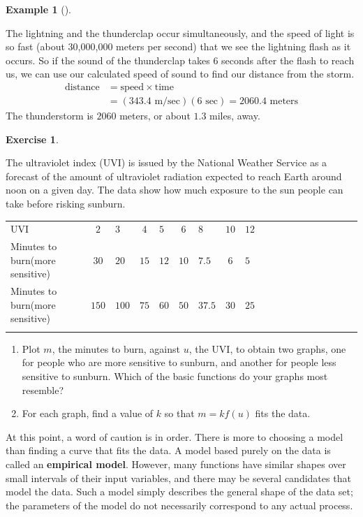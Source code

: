 \documentclass[10pt,]{book}
\newcommand{\terminology}[1]{\textbf{#1}}
\theoremstyle{plain}
\theoremstyle{definition}
\newtheorem{exercise}[theorem]{Exercise}
\theoremstyle{definition}
\newtheorem{example}[theorem]{Example}
\numberwithin{equation}{section}
\newcommand{\hrulethin}  {\noalign{\hrule height 0.04em}}
\newcommand{\hrulethick} {\noalign{\hrule height 0.11em}}
\newcommand{\amp}{ & }
\begin{document}
\begin{example}[]
\begin{enumerate}[label=*\alph**]
                The lightning and the thunderclap occur simultaneously, and the speed of light is so fast (about 30,000,000 meters per second) that we see the lightning flash as it occurs. So if the sound of the thunderclap takes \(6\) seconds after the flash to reach us, we can use our calculated speed of sound to find our distance from the storm. 
                \begin{align}
                \text{distance} \amp= \text{speed} \times \text{time} \\
                \amp = (343.4\text{  m/sec}) (6 \text{ sec}) = 2060.4 \text{ meters}
                \end{align}
                The thunderstorm is \(2060\) meters, or about \(1.3\) miles, away.
\end{enumerate}
\end{example}
\begin{exercise}\label{exercise-UVI}

    The ultraviolet index (UVI) is issued by the National Weather Service as a forecast of the amount of ultraviolet radiation expected to reach Earth around noon on a given day. The data show how much exposure to the sun people can take before risking sunburn.
    \leavevmode%
\begin{table}
\centering
\begin{tabular}{AcAcAcAcAcAcAcAcAcA}\hrulethick
UVI%
&\(2\)&\(3\)&\(4\)&\(5\)&\(6\)&\(8\)&\(10\)&\(12\)\tabularnewline\hrulethin
Minutes to burn(more sensitive)%
&\(30\)&\(20\)&\(15\)&\(12\)&\(10\)&\(7.5\)&\(6\)&\(5\)\tabularnewline\hrulethin
Minutes to burn(more sensitive)%
&\(150\)&\(100\)&\(75\)&\(60\)&\(50\)&\(37.5\)&\(30\)&\(25\)\tabularnewline\hrulethin
\end{tabular}
\end{table}
\leavevmode%
\begin{enumerate}[label=*\alph**]
\item\hypertarget{li-333}{}Plot \(m\), the minutes to burn, against \(u\), the UVI, to obtain two graphs, one for people who are more sensitive to sunburn, and another for people less sensitive to sunburn. Which of the basic functions do your graphs most resemble?\item\hypertarget{li-334}{}For each graph, find a value of \(k\) so that \(m = k f(u)\) fits the data.\end{enumerate}
\end{exercise}
\par

    At this point, a word of caution is in order. There is more to choosing a model than finding a curve that fits the data. A model based purely on the data is called an \terminology{empirical model}. However, many functions have similar shapes over small intervals of their input variables, and there may be several candidates that model the data. Such a model simply describes the general shape of the data set; the parameters of the model do not necessarily correspond to any actual process.
%
\par
\end{document}
